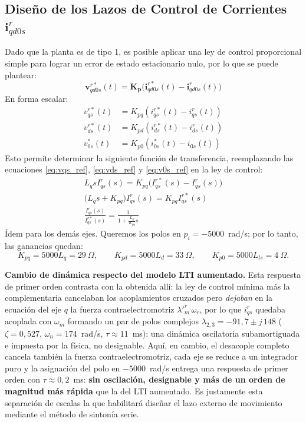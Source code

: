 \documentclass[12pt, a4paper,journal, onecolumn, compsoc]{IEEEtran}
\begin{document}
\subsection{Diseño de los Lazos de Control de Corrientes $\bm{i}_{qd0s}^r$}
Dado que la planta es de tipo 1, es posible aplicar una ley de control proporcional simple para lograr un error de estado estacionario nulo, por lo que se puede plantear:
\begin{equation}
    \bm{v}_{qd0s}^{r*}(t) = \bm{K_p} \big(\bm{i}_{qd0s}^{r*}(t)-\bm{i}_{qd0s}^{r}(t)\big)
\end{equation}
En forma escalar:
\begin{equation*}
\begin{aligned}
v_{qs}^{r*}(t) &= K_{pq} \left(i_{qs}^{r*}(t) - i_{qs}^{r}(t)\right) \\
v_{ds}^{r*}(t) &= K_{pd} \left(i_{ds}^{r*}(t) - i_{ds}^{r}(t)\right) \\
v_{0s}^{*}(t) &= K_{p0} \left(i_{0s}^{*}(t) - i_{0s}(t)\right)
\end{aligned}
\end{equation*}
Esto permite determinar la siguiente función de transferencia, reemplazando las ecuaciones \eqref{eq:vqs_ref}, \eqref{eq:vds_ref} y \eqref{eq:v0s_ref} en la ley de control:
\begin{gather*}
    L_qsI_{qs}^r(s) = K_{pq}\big(I_{qs}^{r*}(s)-I_{qs}^{r}(s)\big) \\ 
    \Big(L_qs+K_{pq}\Big)I_{qs}^r(s)=K_{pq}I_{qs}^{r*}(s) \\
    \frac{I_{qs}^r(s)}{I_{qs}^{r*}(s)} = \frac{1}{1+\frac{L_q}{K_{pq}}s}
\end{gather*}
Ídem para los demás ejes.
Queremos los polos en $p_i=-5000$~rad/s; por lo tanto, las ganancias quedan:
\[
K_{pq}=5000L_q=29~\Omega, \qquad
K_{pd}=5000L_d=33~\Omega, \qquad
K_{p0}=5000L_{ls}=4~\Omega.
\]

\textbf{Cambio de dinámica respecto del modelo LTI aumentado.} Esta respuesta de primer orden contrasta con la obtenida allí: la ley de control mínima más la complementaria cancelaban los acoplamientos cruzados pero \textit{dejaban} en la ecuación del eje $q$ la fuerza contraelectromotriz $\lambda'^r_m\,\omega_r$, por lo que $i_{qs}^r$ quedaba acoplada con $\omega_m$ formando un par de polos complejos $\lambda_{2,3} = -91{,}7 \pm j\,148$ ($\zeta = 0{,}527$, $\omega_n = 174$~rad/s, $\tau \approx 11$~ms): una dinámica oscilatoria subamortiguada e impuesta por la física, no designable. Aquí, en cambio, el desacople completo cancela también la fuerza contraelectromotriz, cada eje se reduce a un integrador puro y la asignación del polo en $-5000$~rad/s entrega una respuesta de primer orden con $\tau \approx 0{,}2$~ms: \textbf{sin oscilación, designable y más de un orden de magnitud más rápida} que la del LTI aumentado. Es justamente esta separación de escalas la que habilitará diseñar el lazo externo de movimiento mediante el método de sintonía serie.
\end{document}
